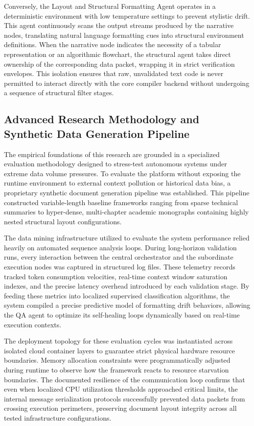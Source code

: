 Conversely, the Layout and Structural Formatting Agent operates in a deterministic environment with low temperature settings to prevent stylistic drift. This agent continuously scans the output streams produced by the narrative nodes, translating natural language formatting cues into structural environment definitions. When the narrative node indicates the necessity of a tabular representation or an algorithmic flowchart, the structural agent takes direct ownership of the corresponding data packet, wrapping it in strict verification envelopes. This isolation ensures that raw, unvalidated text code is never permitted to interact directly with the core compiler backend without undergoing a sequence of structural filter stages.

\subsection{Advanced Research Methodology and Synthetic Data Generation Pipeline}
The empirical foundations of this research are grounded in a specialized evaluation methodology designed to stress-test autonomous systems under extreme data volume pressures. To evaluate the platform without exposing the runtime environment to external context pollution or historical data bias, a proprietary synthetic document generation pipeline was established. This pipeline constructed variable-length baseline frameworks ranging from sparse technical summaries to hyper-dense, multi-chapter academic monographs containing highly nested structural layout configurations.

The data mining infrastructure utilized to evaluate the system performance relied heavily on automated sequence analysis loops. During long-horizon validation runs, every interaction between the central orchestrator and the subordinate execution nodes was captured in structured log files. These telemetry records tracked token consumption velocities, real-time context window saturation indexes, and the precise latency overhead introduced by each validation stage. By feeding these metrics into localized supervised classification algorithms, the system compiled a precise predictive model of formatting drift behaviors, allowing the QA agent to optimize its self-healing loops dynamically based on real-time execution contexts.

The deployment topology for these evaluation cycles was instantiated across isolated cloud container layers to guarantee strict physical hardware resource boundaries. Memory allocation constraints were programmatically adjusted during runtime to observe how the framework reacts to resource starvation boundaries. The documented resilience of the communication loop confirms that even when localized CPU utilization thresholds approached critical limits, the internal message serialization protocols successfully prevented data packets from crossing execution perimeters, preserving document layout integrity across all tested infrastructure configurations.

